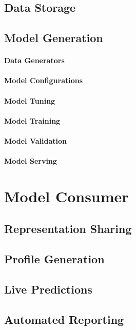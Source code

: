 \subsection{Data Storage}
\lorem
\subsection{Model Generation}
\lorem
\paragraph*{Data Generators} \lorem
\paragraph*{Model Configurations} \lorem
\paragraph*{Model Tuning} \lorem
\paragraph*{Model Training} \lorem
\paragraph*{Model Validation} \lorem
\paragraph*{Model Serving} \lorem

\section{Model Consumer}
\lorem
\subsection{Representation Sharing}
\lorem
\subsection{Profile Generation}
\lorem
\subsection{Live Predictions}
\lorem
\subsection{Automated Reporting}
\lorem

